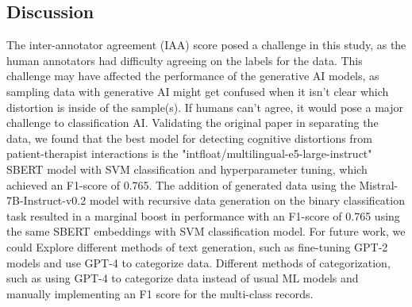 \documentclass[a0,landscape]{a0poster}
\begin{document}
\begin{multicols}{4}
\color{Teal}
\section*{Discussion}
\color{Black}

The inter-annotator agreement (IAA) score posed a challenge in this study, as the human annotators had difficulty agreeing on the labels for the data. 
This challenge may have affected the performance of the generative AI models, as sampling data with generative AI might get confused when it isn't clear which distortion 
is inside of the sample(s). If humans can't agree, it would pose a major challenge to classification AI. Validating the original paper in separating the data, 
we found that the best model for detecting cognitive distortions from patient-therapist interactions is the "intfloat/multilingual-e5-large-instruct" SBERT model with 
SVM classification and hyperparameter tuning, which achieved an F1-score of 0.765. The addition of generated data using the Mistral-7B-Instruct-v0.2 model with recursive 
data generation on the binary classification task resulted in a marginal boost in performance with an F1-score of 0.765 using the same SBERT embeddings with 
SVM classification model.
For future work, we could Explore different methods of text generation, such as fine-tuning GPT-2 models and use GPT-4 to categorize data.
Different methods of categorization, such as using GPT-4 to categorize data instead of usual ML models and manually implementing an F1 score for the multi-class records.



\end{multicols}
\end{document}
